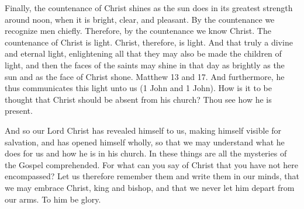 Finally, the countenance of Christ shines as the sun does in its greatest strength around noon, when it is bright, clear, and pleasant. By the countenance we recognize men chiefly. Therefore, by the countenance we know Christ. The countenance of Christ is light. Christ, therefore, is light. And that truly a divine and eternal light, enlightening all that they may also be made the children of light, and then the faces of the saints may shine in that day as brightly as the sun and as the face of Christ shone. Matthew 13 and 17. And furthermore, he thus communicates this light unto us (1 John and 1 John). How is it to be thought that Christ should be absent from his church? Thou see how he is present.

And so our Lord Christ has revealed himself to us, making himself visible for salvation, and has opened himself wholly, so that we may understand what he does for us and how he is in his church. In these things are all the mysteries of the Gospel comprehended. For what can you say of Christ that you have not here encompassed? Let us therefore remember them and write them in our minds, that we may embrace Christ, king and bishop, and that we never let him depart from our arms. To him be glory.

